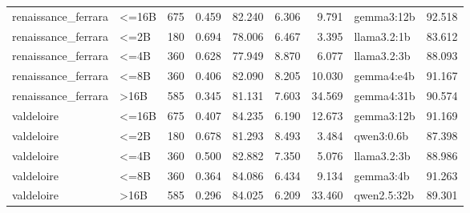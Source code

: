 \begin{tabular}{llrrrrrlr}
renaissance\_ferrara & <=16B & 675 & 0.459 & 82.240 & 6.306 & 9.791 & gemma3:12b & 92.518 \\
renaissance\_ferrara & <=2B & 180 & 0.694 & 78.006 & 6.467 & 3.395 & llama3.2:1b & 83.612 \\
renaissance\_ferrara & <=4B & 360 & 0.628 & 77.949 & 8.870 & 6.077 & llama3.2:3b & 88.093 \\
renaissance\_ferrara & <=8B & 360 & 0.406 & 82.090 & 8.205 & 10.030 & gemma4:e4b & 91.167 \\
renaissance\_ferrara & >16B & 585 & 0.345 & 81.131 & 7.603 & 34.569 & gemma4:31b & 90.574 \\
valdeloire & <=16B & 675 & 0.407 & 84.235 & 6.190 & 12.673 & gemma3:12b & 91.169 \\
valdeloire & <=2B & 180 & 0.678 & 81.293 & 8.493 & 3.484 & qwen3:0.6b & 87.398 \\
valdeloire & <=4B & 360 & 0.500 & 82.882 & 7.350 & 5.076 & llama3.2:3b & 88.986 \\
valdeloire & <=8B & 360 & 0.364 & 84.086 & 6.434 & 9.134 & gemma3:4b & 91.263 \\
valdeloire & >16B & 585 & 0.296 & 84.025 & 6.209 & 33.460 & qwen2.5:32b & 89.301 \\
\bottomrule
\end{tabular}
